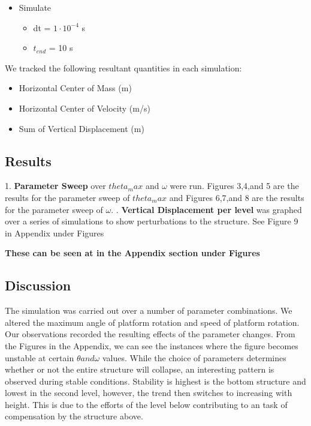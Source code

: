 \documentclass{article}
\begin{document}
\begin{flushleft}
\begin{itemize}
\begin{itemize}
    \end{itemize}
    \item Simulate
    \begin{itemize}
        \item dt = $1\cdot 10^{-4}$ s
        \item $t_{end}$ = 10 s
    \end{itemize}
\end{itemize}
We tracked the following resultant quantities in each simulation: 
\begin{itemize}
    \item Horizontal Center of Mass (m)
    \item Horizontal Center of Velocity (m/s)
    \item Sum of Vertical Displacement (m)
\end{itemize} 
\end{flushleft}
\subsection{Results}
\begin{flushleft}
1. \textbf{Parameter Sweep} over $theta_max$ and $\omega$ were run.\newline 
Figures 3,4,and 5 are the results for the parameter sweep of $theta_max$ and Figures 6,7,and 8 are the results for the parameter sweep of $\omega$. . \textbf{Vertical Displacement per level} was graphed over a series of simulations to show perturbations to the structure. See Figure 9 in Appendix under Figures 

\textbf{These can be seen at in the Appendix section under Figures}
\end{flushleft}

\subsection{Discussion}


\begin{flushleft}{The simulation was carried out over a number of parameter combinations.  We altered the maximum angle of platform rotation and speed of platform rotation.  Our observations recorded the resulting effects of the parameter changes. From the Figures in the Appendix, we can see the instances where the figure becomes unstable at certain $\theta and \omega$ values. 
While the choice of parameters determines whether or not the entire structure will collapse, an interesting pattern is observed during stable conditions.  Stability is highest is the bottom structure and lowest in the second level, however, the trend then switches to increasing with height. This is due to the efforts of the level below contributing to an  task of compensation by the structure above.} 
\end{flushleft}
\end{document}
